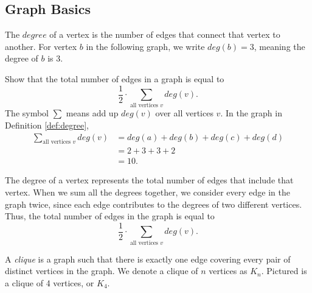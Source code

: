 \documentclass[11pt]{article}
\begin{document}
\subsection{Graph Basics}

\begin{definition}
\label{def:degree}
The $degree$ of a vertex is the number of edges that connect that vertex to another. For vertex $b$ in the following graph, we write $deg(b) = 3$,
meaning the degree of $b$ is 3.
\begin{center}
\end{center}
\end{definition}

\begin{problem}[3 points] %
Show that the total number of edges in a graph is equal to
\[\frac{1}{2} \cdot \sum_{\text{all vertices $v$}} deg(v).\]
The symbol $\sum$ means add up $deg(v)$ over all vertices $v$. In the graph in Definition \ref{def:degree},
\begin{align*}
\sum_{\text{all vertices $v$}} deg(v) &= deg(a) + deg(b) + deg(c) + deg(d) \\
&= 2 + 3 + 3 + 2 \\
&= 10.
\end{align*}
\end{problem}

\begin{solution}
The degree of a vertex represents the total number of edges that include that vertex. When we sum all the degrees together,
we consider every edge in the graph twice, since each edge contributes to the degrees of two different vertices. Thus, the total number
of edges in the graph is equal to 
\[\frac{1}{2} \cdot \sum_{\text{all vertices $v$}} deg(v).\]
\end{solution}

\begin{definition}
\label{def:clique}
A \textit{clique} is a graph such that there is exactly one edge covering every pair of distinct vertices in the graph.
We denote a clique of $n$ vertices as $K_n$.
Pictured is a clique of 4 vertices, or $K_4$.
\begin{center}
\end{center}
\end{definition}
\end{document}
